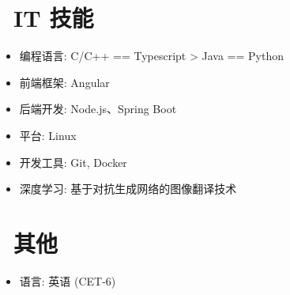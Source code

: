 \documentclass{resume}
\begin{document}


\section{\faCogs\ IT 技能}
\begin{itemize}[parsep=0.5ex]
  \item 编程语言: C/C++ == Typescript > Java == Python
  \item 前端框架: Angular
  \item 后端开发: Node.js、Spring Boot
  \item 平台: Linux
  \item 开发工具: Git, Docker
  \item 深度学习: 基于对抗生成网络的图像翻译技术
\end{itemize}


\section{\faInfo\ 其他}
\begin{itemize}[parsep=0.5ex]
  \item 语言: 英语 (CET-6)
\end{itemize}

%
%
\end{document}
